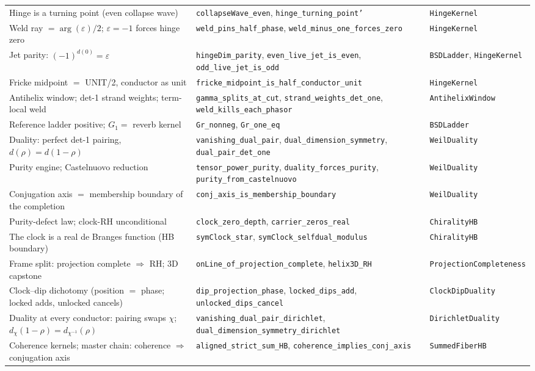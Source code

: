 \documentclass[11pt]{article}
\newcommand{\code}[1]{\texttt{#1}}
\begin{document}
\begin{longtable}{p{} p{} p{}}
Hinge is a turning point (even collapse wave) & \code{collapseWave\_even}, \code{hinge\_turning\_point'} & \code{HingeKernel}\\
Weld ray $=\arg(\varepsilon)/2$; $\varepsilon{=}{-}1$ forces hinge zero & \code{weld\_pins\_half\_phase}, \code{weld\_minus\_one\_forces\_zero} & \code{HingeKernel}\\
Jet parity: $(-1)^{d(0)}=\varepsilon$ & \code{hingeDim\_parity}, \code{even\_live\_jet\_is\_even}, \code{odd\_live\_jet\_is\_odd} & \code{BSDLadder}, \code{HingeKernel}\\
Fricke midpoint $=$ UNIT/2, conductor as unit & \code{fricke\_midpoint\_is\_half\_conductor\_unit} & \code{HingeKernel}\\
Antihelix window; det-1 strand weights; term-local weld & \code{gamma\_splits\_at\_cut}, \code{strand\_weights\_det\_one}, \code{weld\_kills\_each\_phasor} & \code{AntihelixWindow}\\
Reference ladder positive; $G_1=$ reverb kernel & \code{Gr\_nonneg}, \code{Gr\_one\_eq} & \code{BSDLadder}\\
Duality: perfect det-1 pairing, $d(\rho)=d(1{-}\rho)$ & \code{vanishing\_dual\_pair}, \code{dual\_dimension\_symmetry}, \code{dual\_pair\_det\_one} & \code{WeilDuality}\\
Purity engine; Castelnuovo reduction & \code{tensor\_power\_purity}, \code{duality\_forces\_purity}, \code{purity\_from\_castelnuovo} & \code{WeilDuality}\\
Conjugation axis $=$ membership boundary of the completion & \code{conj\_axis\_is\_membership\_boundary} & \code{WeilDuality}\\
Purity-defect law; clock-RH unconditional & \code{clock\_zero\_depth}, \code{carrier\_zeros\_real} & \code{ChiralityHB}\\
The clock is a real de Branges function (HB boundary) & \code{symClock\_star}, \code{symClock\_selfdual\_modulus} & \code{ChiralityHB}\\
Frame split: projection complete $\Rightarrow$ RH; 3D capstone & \code{onLine\_of\_projection\_complete}, \code{helix3D\_RH} & \code{ProjectionCompleteness}\\
Clock--dip dichotomy (position $=$ phase; locked adds, unlocked cancels) & \code{dip\_projection\_phase}, \code{locked\_dips\_add}, \code{unlocked\_dips\_cancel} & \code{ClockDipDuality}\\
Duality at every conductor: pairing swaps $\chi$; $d_\chi(1{-}\rho)=d_{\chi^{-1}}(\rho)$ & \code{vanishing\_dual\_pair\_dirichlet}, \code{dual\_dimension\_symmetry\_dirichlet} & \code{DirichletDuality}\\
Coherence kernels; master chain: coherence $\Rightarrow$ conjugation axis & \code{aligned\_strict\_sum\_HB}, \code{coherence\_implies\_conj\_axis} & \code{SummedFiberHB}\\
\end{longtable}
\endgroup
\end{document}
